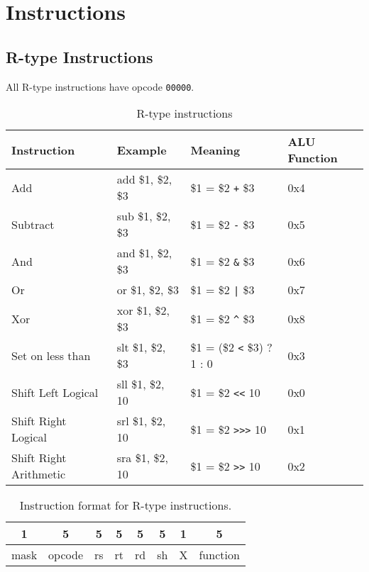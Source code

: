 \documentclass[../main/report.tex]{subfiles}
\begin{document}

\section{Instructions}

\subsection{R-type Instructions}

All R-type instructions have opcode \verb/00000/.

\begin{table}[H]
    \begin{tabular}{llll}
    \textbf{Instruction}   & \textbf{Example}  & \textbf{Meaning}          & \textbf{ALU Function} \\
    \hline
    \hline
    Add                    & add \$1, \$2, \$3 & \$1 = \$2 \verb/+/ \$3    & 0x4          \\
    Subtract               & sub \$1, \$2, \$3 & \$1 = \$2 \verb/-/ \$3    & 0x5          \\ \hline
    And                    & and \$1, \$2, \$3 & \$1 = \$2 \verb/&/ \$3    & 0x6          \\
    Or                     & or \$1, \$2, \$3  & \$1 = \$2 \verb/|/ \$3    & 0x7          \\
    Xor                    & xor \$1, \$2, \$3 & \$1 = \$2 \verb/^/ \$3    & 0x8          \\ \hline
    Set on less than       & slt \$1, \$2, \$3 & \$1 = (\$2 \verb/</ \$3) ? 1 : 0 & 0x3   \\ \hline
    Shift Left Logical     & sll \$1, \$2, 10  & \$1 = \$2 \verb/<</ 10    & 0x0          \\
    Shift Right Logical    & srl \$1, \$2, 10  & \$1 = \$2 \verb/>>>/ 10   & 0x1          \\
    Shift Right Arithmetic & sra \$1, \$2, 10  & \$1 = \$2 \verb/>>/ 10    & 0x2          \\
    \end{tabular}
    \label{table:r_type_instructions}
    \caption{R-type instructions}
\end{table}

\begin{table}[H]
    \centering
    \begin{tabular}{|c|c|c|c|c|c|c|c|}
    \multicolumn{1}{c}{1} & \multicolumn{1}{c}{5} & \multicolumn{1}{c}{5}  & \multicolumn{1}{c}{5}  & \multicolumn{1}{c}{5} & \multicolumn{1}{c}{5} & \multicolumn{1}{c}{1} & \multicolumn{1}{c}{5}    \\ \hline
    mask & opcode & rs & rt & rd & sh & X & function \\ \hline
    \end{tabular}
    \label{table:r_type_format}
    \caption{Instruction format for R-type instructions.}
\end{table}
\end{document}
